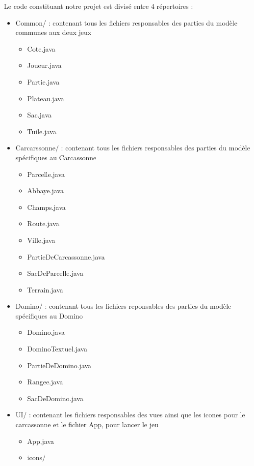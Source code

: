 \documentclass{article}
\begin{document}
Le code constituant notre projet est divisé entre 4 répertoires :
\begin{itemize}
    \item Common/ : contenant tous les fichiers responsables des parties du modèle communes aux deux jeux
    \begin{itemize}
        \item Cote.java
        \item Joueur.java 
        \item Partie.java
        \item Plateau.java
        \item Sac.java
        \item Tuile.java
    \end{itemize}    
    \item Carcarssonne/ : contenant tous les fichiers responsables des parties du modèle spécifiques au Carcassonne
    \begin{itemize}        
        \item Parcelle.java
        \item Abbaye.java
        \item Champs.java
        \item Route.java
        \item Ville.java
        \item PartieDeCarcassonne.java        
        \item SacDeParcelle.java
        \item Terrain.java        
    \end{itemize}
    \item Domino/ : contenant tous les fichiers reponsables des parties du modèle spécifiques au Domino
    \begin{itemize}
        \item Domino.java
        \item DominoTextuel.java
        \item PartieDeDomino.java
        \item Rangee.java
        \item SacDeDomino.java
    \end{itemize}
    \item UI/ : contenant les fichiers responsables des vues ainsi que les icones pour le carcassonne et le fichier App, pour lancer le jeu 
    \begin{itemize}
        \item App.java
        \item icons/

\end{itemize}
\end{itemize}
\end{document}
